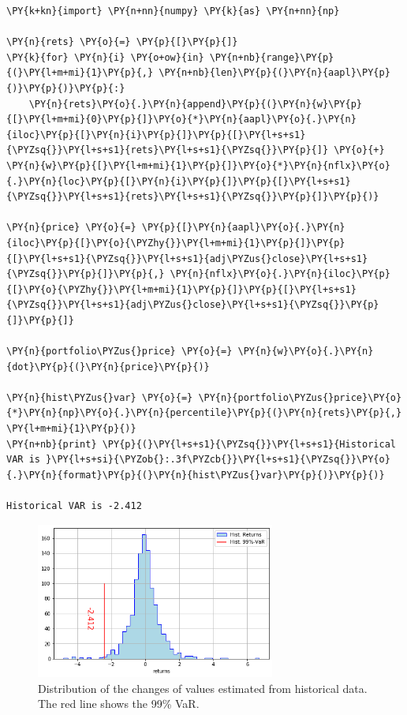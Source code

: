 \begin{tcolorbox}[breakable, size=fbox, boxrule=1pt, pad at break*=1mm,colback=cellbackground, colframe=cellborder]
\begin{Verbatim}[commandchars=\\\{\}]
\PY{k+kn}{import} \PY{n+nn}{numpy} \PY{k}{as} \PY{n+nn}{np}
				
\PY{n}{rets} \PY{o}{=} \PY{p}{[}\PY{p}{]}
\PY{k}{for} \PY{n}{i} \PY{o+ow}{in} \PY{n+nb}{range}\PY{p}{(}\PY{l+m+mi}{1}\PY{p}{,} \PY{n+nb}{len}\PY{p}{(}\PY{n}{aapl}\PY{p}{)}\PY{p}{)}\PY{p}{:}
    \PY{n}{rets}\PY{o}{.}\PY{n}{append}\PY{p}{(}\PY{n}{w}\PY{p}{[}\PY{l+m+mi}{0}\PY{p}{]}\PY{o}{*}\PY{n}{aapl}\PY{o}{.}\PY{n}{iloc}\PY{p}{[}\PY{n}{i}\PY{p}{]}\PY{p}{[}\PY{l+s+s1}{\PYZsq{}}\PY{l+s+s1}{rets}\PY{l+s+s1}{\PYZsq{}}\PY{p}{]} \PY{o}{+} \PY{n}{w}\PY{p}{[}\PY{l+m+mi}{1}\PY{p}{]}\PY{o}{*}\PY{n}{nflx}\PY{o}{.}\PY{n}{loc}\PY{p}{[}\PY{n}{i}\PY{p}{]}\PY{p}{[}\PY{l+s+s1}{\PYZsq{}}\PY{l+s+s1}{rets}\PY{l+s+s1}{\PYZsq{}}\PY{p}{]}\PY{p}{)}
		
\PY{n}{price} \PY{o}{=} \PY{p}{[}\PY{n}{aapl}\PY{o}{.}\PY{n}{iloc}\PY{p}{[}\PY{o}{\PYZhy{}}\PY{l+m+mi}{1}\PY{p}{]}\PY{p}{[}\PY{l+s+s1}{\PYZsq{}}\PY{l+s+s1}{adj\PYZus{}close}\PY{l+s+s1}{\PYZsq{}}\PY{p}{]}\PY{p}{,} \PY{n}{nflx}\PY{o}{.}\PY{n}{iloc}\PY{p}{[}\PY{o}{\PYZhy{}}\PY{l+m+mi}{1}\PY{p}{]}\PY{p}{[}\PY{l+s+s1}{\PYZsq{}}\PY{l+s+s1}{adj\PYZus{}close}\PY{l+s+s1}{\PYZsq{}}\PY{p}{]}\PY{p}{]}
		
\PY{n}{portfolio\PYZus{}price} \PY{o}{=} \PY{n}{w}\PY{o}{.}\PY{n}{dot}\PY{p}{(}\PY{n}{price}\PY{p}{)}
		
\PY{n}{hist\PYZus{}var} \PY{o}{=} \PY{n}{portfolio\PYZus{}price}\PY{o}{*}\PY{n}{np}\PY{o}{.}\PY{n}{percentile}\PY{p}{(}\PY{n}{rets}\PY{p}{,} \PY{l+m+mi}{1}\PY{p}{)}
\PY{n+nb}{print} \PY{p}{(}\PY{l+s+s1}{\PYZsq{}}\PY{l+s+s1}{Historical VAR is }\PY{l+s+si}{\PYZob{}:.3f\PYZcb{}}\PY{l+s+s1}{\PYZsq{}}\PY{o}{.}\PY{n}{format}\PY{p}{(}\PY{n}{hist\PYZus{}var}\PY{p}{)}\PY{p}{)}

Historical VAR is -2.412
\end{Verbatim}
\end{tcolorbox}

\begin{figure}[htb]
	\centering
	\includegraphics[width=0.7\textwidth]{figures/historical_var.png}
	\caption{Distribution of the changes of values estimated from historical data. The red line shows the 99\% VaR.}
	\label{fig:hist_var}
\end{figure}

